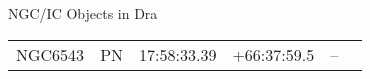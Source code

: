 \begin{block}{NGC/IC Objects in Dra}
  \centering
  \begin{tabularx}{\textwidth}{llrrll} \toprule 
    NGC6543 & PN & 17:58:33.39 & +66:37:59.5  & -- \\ 
  \end{tabularx}
\end{block}